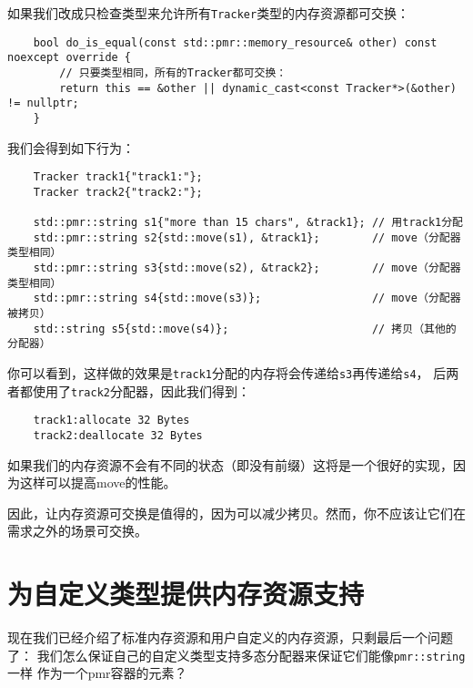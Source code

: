 如果我们改成只检查类型来允许所有\texttt{Tracker}类型的内存资源都可交换：
\begin{lstlisting}
    bool do_is_equal(const std::pmr::memory_resource& other) const noexcept override {
        // 只要类型相同，所有的Tracker都可交换：
        return this == &other || dynamic_cast<const Tracker*>(&other) != nullptr;
    }
\end{lstlisting}
我们会得到如下行为：
\begin{lstlisting}
    Tracker track1{"track1:"};
    Tracker track2{"track2:"};

    std::pmr::string s1{"more than 15 chars", &track1}; // 用track1分配
    std::pmr::string s2{std::move(s1), &track1};        // move（分配器类型相同）
    std::pmr::string s3{std::move(s2), &track2};        // move（分配器类型相同）
    std::pmr::string s4{std::move(s3)};                 // move（分配器被拷贝）
    std::string s5{std::move(s4)};                      // 拷贝（其他的分配器）
\end{lstlisting}
你可以看到，这样做的效果是\texttt{track1}分配的内存将会传递给\texttt{s3}再传递给\texttt{s4}，
后两者都使用了\texttt{track2}分配器，因此我们得到：
\begin{lstlisting}
    track1:allocate 32 Bytes
    track2:deallocate 32 Bytes
\end{lstlisting}
如果我们的内存资源不会有不同的状态（即没有前缀）这将是一个很好的实现，因为这样可以提高move的性能。

因此，让内存资源可交换是值得的，因为可以减少拷贝。然而，你不应该让它们在需求之外的场景可交换。


\section{为自定义类型提供内存资源支持}\label{ch29.3}
现在我们已经介绍了标准内存资源和用户自定义的内存资源，只剩最后一个问题了：
我们怎么保证自己的自定义类型支持多态分配器来保证它们能像\texttt{pmr::string}一样
作为一个pmr容器的元素？

